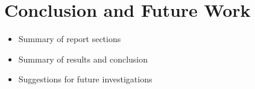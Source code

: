 \documentclass[12pt]{article}
\begin{document}
\newpage

\section{Conclusion and Future Work}
\label{sec:Conclusion}
\vspace{-12pt}

\begin{itemize}
\item Summary of report sections
\item Summary of results and conclusion
\item Suggestions for future investigations
\end{itemize}

\newpage



\nocite{*}
\end{document}
